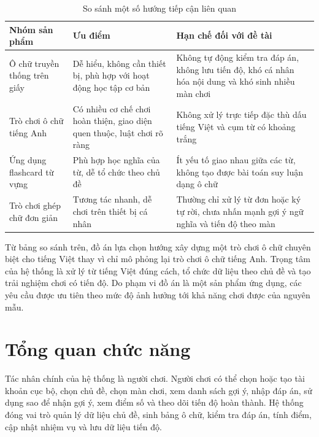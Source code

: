 \documentclass[../DoAn.tex]{subfiles}
\begin{document}
\begin{table}[H]
\centering
\begin{tabularx}{\textwidth}{|>{\RaggedRight\arraybackslash}p{3.1cm}|>{\RaggedRight\arraybackslash}X|>{\RaggedRight\arraybackslash}X|}
\hline
\textbf{Nhóm sản phẩm} & \textbf{Ưu điểm} & \textbf{Hạn chế đối với đề tài} \\ \hline
Ô chữ truyền thống trên giấy & Dễ hiểu, không cần thiết bị, phù hợp với hoạt động học tập cơ bản & Không tự động kiểm tra đáp án, không lưu tiến độ, khó cá nhân hóa nội dung và khó sinh nhiều màn chơi \\ \hline
Trò chơi ô chữ tiếng Anh & Có nhiều cơ chế chơi hoàn thiện, giao diện quen thuộc, luật chơi rõ ràng & Không xử lý trực tiếp đặc thù dấu tiếng Việt và cụm từ có khoảng trắng \\ \hline
Ứng dụng flashcard từ vựng & Phù hợp học nghĩa của từ, dễ tổ chức theo chủ đề & Ít yếu tố giao nhau giữa các từ, không tạo được bài toán suy luận dạng ô chữ \\ \hline
Trò chơi ghép chữ đơn giản & Tương tác nhanh, dễ chơi trên thiết bị cá nhân & Thường chỉ xử lý từ đơn hoặc ký tự rời, chưa nhấn mạnh gợi ý ngữ nghĩa và tiến độ theo màn \\ \hline
\end{tabularx}
\caption{So sánh một số hướng tiếp cận liên quan}
\label{table:related_products}
\end{table}

Từ bảng so sánh trên, đồ án lựa chọn hướng xây dựng một trò chơi ô chữ chuyên biệt cho tiếng Việt thay vì chỉ mô phỏng lại trò chơi ô chữ tiếng Anh. Trọng tâm của hệ thống là xử lý từ tiếng Việt đúng cách, tổ chức dữ liệu theo chủ đề và tạo trải nghiệm chơi có tiến độ. Do phạm vi đồ án là một sản phẩm ứng dụng, các yêu cầu được ưu tiên theo mức độ ảnh hưởng tới khả năng chơi được của nguyên mẫu.

\section{Tổng quan chức năng}
\label{section:2.2}
Tác nhân chính của hệ thống là người chơi. Người chơi có thể chọn hoặc tạo tài khoản cục bộ, chọn chủ đề, chọn màn chơi, xem danh sách gợi ý, nhập đáp án, sử dụng sao để nhận gợi ý, xem điểm số và theo dõi tiến độ hoàn thành. Hệ thống đóng vai trò quản lý dữ liệu chủ đề, sinh bảng ô chữ, kiểm tra đáp án, tính điểm, cập nhật nhiệm vụ và lưu dữ liệu tiến độ.
\end{document}
